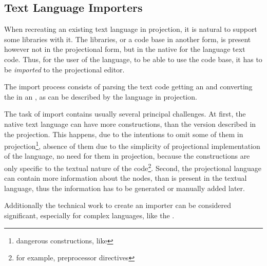
\subsection{Text Language Importers}
\label{importers}

When recreating an existing text language in projection, it is natural to support some libraries with it. The libraries, or a code 
base in another form, is present however not in the projectional form, but in the native for the language text code. Thus, for the 
user of the language, to be able to use the code base, it has to be \emph{imported} to the projectional editor. 

The import process consists of parsing the text code getting an  and converting the  in an , as can
be described by the language in projection.

The task of import contains usually several principal challenges. At first, the native text language can have more 
constructions, than the version described in the projection. This happens, due to the intentions to omit some of them
in projection\footnote{dangerous constructions, like }, absence of them due to the simplicity of projectional 
implementation of the language, no need for them in projection, because the constructions are only specific to the textual nature of 
the code\footnote{for example, preprocessor directives}. Second, the projectional language can contain more information about the nodes,
than is present in the textual language, thus the information has to be generated or manually added later.

Additionally the technical work to create an importer can be considered significant, especially for complex languages, like the \cpppl.
